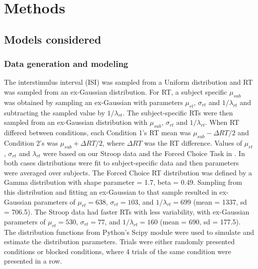 \documentclass[titlepage,12pt] {article}
\begin{document}


\section*{Methods}

\subsection*{Models considered}

\subsubsection*{Data generation and modeling} 


The interstimulus interval (ISI) was sampled from a Uniform distribution and RT was sampled from an ex-Gaussian distribution.  For RT, a subject specific $\mu_{sub}$ was obtained by sampling an ex-Gaussian with parameters $\mu_{rt}$, $\sigma_{rt}$ and $1/\lambda_{rt}$ and subtracting the sampled value by $1/\lambda_{rt}$.  The subject-specific RTs were then sampled from an ex-Gaussian distribution with $\mu_{sub}$, $\sigma_{rt}$ and $1/\lambda_{rt}$.  
When RT differed between conditions, each Condition 1's RT mean was $\mu_{sub} - \Delta RT/2$ and Condition 2's was $\mu_{sub}+\Delta RT/2$, where $\Delta RT$ was the RT difference.  Values of $\mu_{rt}$, $\sigma_{rt}$ and $\lambda_{rt}$ were based on our Stroop data and the Forced Choice Task in \citet{grinband_detection_2008}.  In both cases distributions were fit to subject-specific data and then parameters were averaged over subjects.  The Forced Choice RT distribution was defined by a Gamma distribution with shape parameter = 1.7, beta = 0.49.  Sampling from this distribution and fitting an ex-Gaussian to that sample resulted in ex-Gaussian parameters of $\mu_{rt} = 638$, $\sigma_{rt} = 103$, and $1/\lambda_{rt} = 699$ (mean = 1337, sd = 706.5). The Stroop data had faster RTs with less variability, with ex-Gaussian parameters of  $\mu_{rt} =530$, $\sigma_{rt} = 77$, and $1/\lambda_{rt} = 160$ (mean = 690, sd = 177.5).  The distribution functions from Python's Scipy module were used to simulate and estimate the distribution parameters. Trials were either randomly presented conditions or blocked conditions, where 4 trials of the same condition were presented in a row.
 
\end{document}
